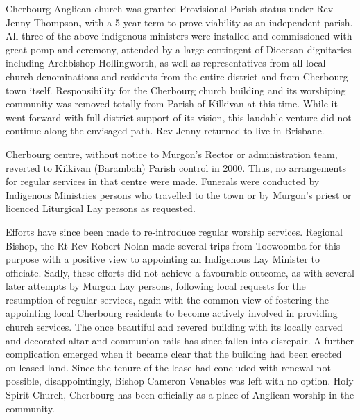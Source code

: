 Cherbourg Anglican church was granted Provisional Parish status under Rev Jenny Thompson\textbf{,} with a 5-year term to prove viability as an independent parish. All three of the above indigenous ministers were installed and commissioned with great pomp and ceremony, attended by a large contingent of Diocesan dignitaries including Archbishop Hollingworth, as well as representatives from all local church denominations and residents from the entire district and from Cherbourg town itself. Responsibility for the Cherbourg church building and its worshiping community was removed totally from Parish of Kilkivan at this time. While it went forward with full district support of its vision, this laudable venture did not continue along the envisaged path. Rev Jenny returned to live in Brisbane.



Cherbourg centre, without notice to Murgon's Rector or administration team, reverted to Kilkivan (Barambah) Parish control in 2000. Thus, no arrangements for regular services in that centre were made. Funerals were conducted by Indigenous Ministries persons who travelled to the town or by Murgon's priest or licenced Liturgical Lay persons as requested.



Efforts have since been made to re-introduce regular worship services. Regional Bishop, the Rt Rev Robert Nolan made several trips from Toowoomba for this purpose with a positive view to appointing an Indigenous Lay Minister to officiate. Sadly, these efforts did not achieve a favourable outcome, as with several later attempts by Murgon Lay persons, following local requests for the resumption of regular services, again with the common view of fostering the appointing local Cherbourg residents to become actively involved in providing church services. The once beautiful and revered building with its locally carved and decorated altar and communion rails has since fallen into disrepair. A further complication emerged when it became clear that the building had been erected on leased land. Since the tenure of the lease had concluded with renewal not possible, disappointingly, Bishop Cameron Venables was left with no option. Holy Spirit Church, Cherbourg has been officially as a place of Anglican worship in the community.



